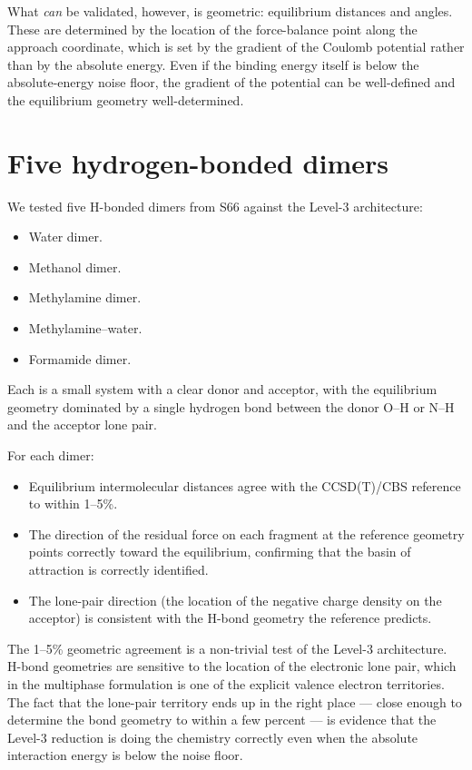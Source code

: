 What \emph{can} be validated, however, is geometric: equilibrium distances and angles. These are determined by the location of the force-balance point along the approach coordinate, which is set by the gradient of the Coulomb potential rather than by the absolute energy. Even if the binding energy itself is below the absolute-energy noise floor, the gradient of the potential can be well-defined and the equilibrium geometry well-determined.

\section{Five hydrogen-bonded dimers}\label{sec:five-dimers}

We tested five H-bonded dimers from S66 against the Level-3 architecture:
\begin{itemize}
\item Water dimer.
\item Methanol dimer.
\item Methylamine dimer.
\item Methylamine--water.
\item Formamide dimer.
\end{itemize}
Each is a small system with a clear donor and acceptor, with the equilibrium geometry dominated by a single hydrogen bond between the donor O--H or N--H and the acceptor lone pair.

For each dimer:
\begin{itemize}
\item Equilibrium intermolecular distances agree with the CCSD(T)/CBS reference to within 1--5\%.
\item The direction of the residual force on each fragment at the reference geometry points correctly toward the equilibrium, confirming that the basin of attraction is correctly identified.
\item The lone-pair direction (the location of the negative charge density on the acceptor) is consistent with the H-bond geometry the reference predicts.
\end{itemize}

The 1--5\% geometric agreement is a non-trivial test of the Level-3 architecture. H-bond geometries are sensitive to the location of the electronic lone pair, which in the multiphase formulation is one of the explicit valence electron territories. The fact that the lone-pair territory ends up in the right place --- close enough to determine the bond geometry to within a few percent --- is evidence that the Level-3 reduction is doing the chemistry correctly even when the absolute interaction energy is below the noise floor.

